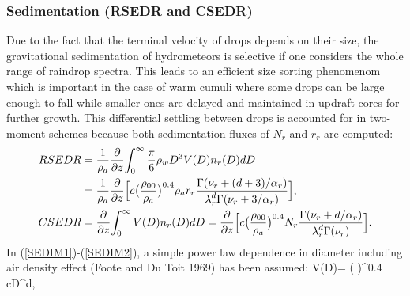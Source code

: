 \subsubsection{Sedimentation (RSEDR and CSEDR)}

Due to the fact that the terminal velocity of drops depends on their size,
the gravitational sedimentation of hydrometeors is selective if one considers 
the whole range of raindrop spectra. This leads to an efficient size sorting 
phenomenom which is important in the case of warm cumuli where some drops 
can be large enough to fall while smaller ones are delayed and maintained 
in updraft cores for further growth. This differential settling between drops 
is accounted for in two-moment schemes because both sedimentation
fluxes of $N_r$ and $r_r$ are computed:
\begin{align}
\label{SEDIM1}
RSEDR &= \frac{\displaystyle{1}}{\displaystyle{\rho_{a}}}
\frac{\displaystyle{\partial}}{\displaystyle{\partial z}}
\displaystyle{\int_0^\infty
\frac{\pi}{6} \rho_w D^3 V(D) n_r(D) dD} \notag \\
      &= \frac{\displaystyle{1}}{\displaystyle{\rho_{a}}}
\frac{\displaystyle{\partial}}{\displaystyle{\partial z}}
\Big[c \big( \frac{\displaystyle{\rho_{00}}}{\displaystyle{\rho_{a}}}\big)
^{0.4} \rho_{a} r_r
\frac{\displaystyle{\Gamma(\nu_r+(d+3)/ \alpha_r)}}{\displaystyle{
\lambda_r^{d}\Gamma(\nu_r+3/ \alpha_r)}}  \Big], \\
\label{SEDIM2}
CSEDR &= \frac{\displaystyle{\partial}}{\displaystyle{\partial z}}
\displaystyle{\int_0^\infty V(D) n_r(D) dD} 
       = \frac{\displaystyle{\partial}}{\displaystyle{\partial z}}
\Big[c \big( \frac{\displaystyle{\rho_{00}}}{\displaystyle{\rho_{a}}}\big)
^{0.4} N_r
\frac{\displaystyle{\Gamma(\nu_r +d/\alpha_r)}}
{\displaystyle{\lambda_r^d \Gamma(\nu_r)}}\Big].
\end{align}
In (\ref{SEDIM1})-(\ref{SEDIM2}), a simple power law dependence in diameter including air
density effect (Foote and Du Toit 1969) has been assumed:
\beq\label{TERMVEL}
V(D)= \Big( \Big)^{0.4} cD^d,
\eeq


